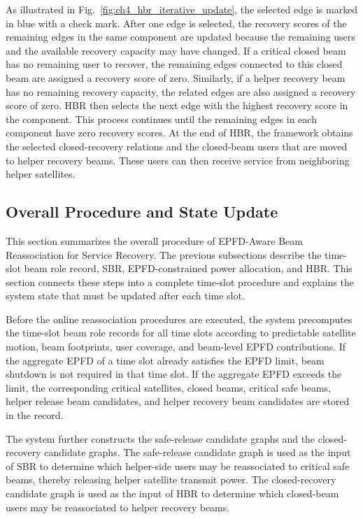 As illustrated in Fig.~\ref{fig:ch4_hbr_iterative_update}, the selected edge is marked in blue with a check mark. After one edge is selected, the recovery scores of the remaining edges in the same component are updated because the remaining users and the available recovery capacity may have changed. If a critical closed beam has no remaining user to recover, the remaining edges connected to this closed beam are assigned a recovery score of zero. Similarly, if a helper recovery beam has no remaining recovery capacity, the related edges are also assigned a recovery score of zero. HBR then selects the next edge with the highest recovery score in the component. This process continues until the remaining edges in each component have zero recovery scores. At the end of HBR, the framework obtains the selected closed-recovery relations and the closed-beam users that are moved to helper recovery beams. These users can then receive service from neighboring helper satellites.

\subsection{Overall Procedure and State Update}

This section summarizes the overall procedure of EPFD-Aware Beam Reassociation for Service Recovery. The previous subsections describe the time-slot beam role record, SBR, EPFD-constrained power allocation, and HBR. This section connects these steps into a complete time-slot procedure and explains the system state that must be updated after each time slot.

Before the online reassociation procedures are executed, the system precomputes the time-slot beam role records for all time slots according to predictable satellite motion, beam footprints, user coverage, and beam-level EPFD contributions. If the aggregate EPFD of a time slot already satisfies the EPFD limit, beam shutdown is not required in that time slot. If the aggregate EPFD exceeds the limit, the corresponding critical satellites, closed beams, critical safe beams, helper release beam candidates, and helper recovery beam candidates are stored in the record.

The system further constructs the safe-release candidate graphs and the closed-recovery candidate graphs. The safe-release candidate graph is used as the input of SBR to determine which helper-side users may be reassociated to critical safe beams, thereby releasing helper satellite transmit power. The closed-recovery candidate graph is used as the input of HBR to determine which closed-beam users may be reassociated to helper recovery beams.

